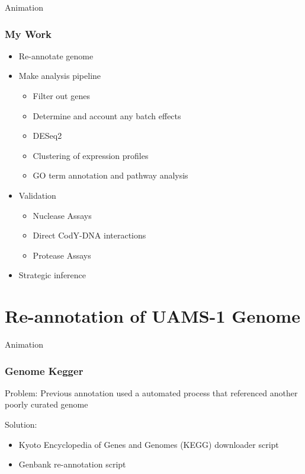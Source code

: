 \documentclass[10pt, compress]{beamer}
\begin{document}
\begin{frame}{Animation}
\frametitle{My Work}
\begin{itemize}[<+- | alert@+>]
	\item Re-annotate genome
	\item Make analysis pipeline
	\begin{itemize}
		\item Filter out genes
		\item Determine and account any batch effects	
		\item DESeq2
		\item Clustering of expression profiles
		\item GO term annotation and pathway analysis
	\end{itemize}
	\item Validation
	\begin{itemize}
		\item Nuclease Assays
		\item Direct CodY-DNA interactions
		\item Protease Assays
	\end{itemize}
	\item Strategic inference

\end{itemize}
\end{frame}

\section{Re-annotation of UAMS-1 Genome}
\begin{frame}{Animation}
\frametitle{Genome Kegger}
Problem:  Previous annotation used a automated process that referenced another poorly curated genome

Solution:
\begin{itemize}[<+- | alert@+>]
	\item Kyoto Encyclopedia of Genes and Genomes (KEGG) downloader script
	\item Genbank re-annotation script
\end{itemize}
\end{frame}
\end{document}

